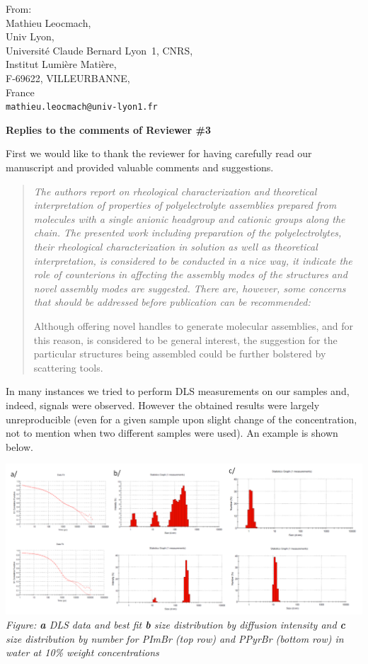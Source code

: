 \documentclass[a4paper, parskip=true, firsthead=false, fromemail=true, foldmarks=false]{scrlttr2}
\newenvironment{quotationi}
{\begin{quotation}\itshape}
{\end{quotation}}
\begin{document}
\begin{letter}{From:\\
Mathieu Leocmach,\\
Univ Lyon,\\ 
Universit\'e Claude Bernard Lyon~1, CNRS,\\
Institut Lumi\`ere Mati\`ere,\\
F-69622, VILLEURBANNE,\\
France\\
\texttt{mathieu.leocmach@univ-lyon1.fr}
}
\clearpage

\textsf{\textbf{Replies to the comments of Reviewer \#3}}

First we would like to thank the reviewer for having carefully read our manuscript and provided valuable comments and suggestions.

\begin{quotationi}
The authors report on rheological characterization and theoretical interpretation of properties of polyelectrolyte assemblies prepared from molecules with a single anionic headgroup and cationic groups along the chain. The presented work including preparation of the polyelectrolytes, their rheological characterization in solution as well as theoretical interpretation, is considered to be conducted in a nice way, it indicate the role of counterions in affecting the assembly modes of the structures and novel assembly modes are suggested. There are, however, some concerns that should be addressed before publication can be recommended:

Although offering novel handles to generate molecular assemblies, and for this reason, is considered to be general interest, the suggestion for the particular structures being assembled could be further bolstered by scattering tools.
\end{quotationi}

In many instances we tried to perform DLS measurements on our samples and, indeed, signals were observed. However the obtained results were largely unreproducible (even for a given sample upon slight change of the concentration, not to mention when two different samples were used). An example is shown below.

\includegraphics[width=\textwidth]{DLS.png}
\textit{Figure: \textbf{a} DLS data and best fit \textbf{b} size distribution by diffusion intensity and \textbf{c} size distribution by number for PImBr (top row) and PPyrBr (bottom row) in water at 10\% weight concentrations}


\end{letter}
\end{document}

